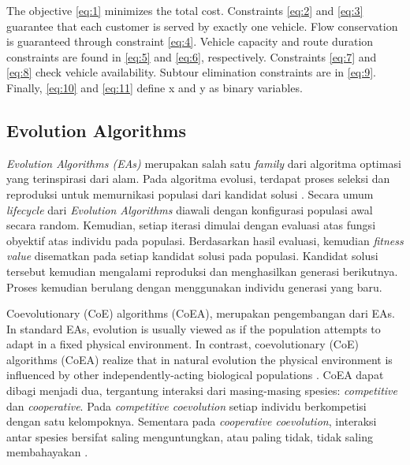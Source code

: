 \documentclass[conference]{IEEEtran}
\begin{document}
The objective \ref{eq:1} minimizes the total cost. Constraints \ref{eq:2} and \ref{eq:3} guarantee that each customer is served by exactly one vehicle. Flow conservation is guaranteed through constraint \ref{eq:4}. Vehicle capacity and route duration constraints are found in \ref{eq:5} and \ref{eq:6}, respectively. Constraints \ref{eq:7} and \ref{eq:8} check vehicle availability. Subtour elimination constraints are in \ref{eq:9}. Finally, \ref{eq:10} and \ref{eq:11} define x and y as binary variables.


\subsection{Evolution Algorithms}
\label{ssec:evolution-algorithms}
\textit{Evolution Algorithms (EAs)} merupakan salah satu \textit{family} dari algoritma optimasi yang terinspirasi dari alam. Pada algoritma evolusi, terdapat proses seleksi dan reproduksi untuk memurnikasi populasi dari kandidat solusi \cite{eugster_many_2003}. Secara umum \textit{lifecycle} dari \textit{Evolution Algorithms} diawali dengan  konfigurasi populasi awal secara random. Kemudian, setiap iterasi dimulai dengan evaluasi atas fungsi obyektif atas individu pada populasi. Berdasarkan hasil evaluasi, kemudian \textit{fitness value} disematkan pada setiap kandidat solusi pada populasi. Kandidat solusi tersebut kemudian mengalami reproduksi dan menghasilkan generasi berikutnya. Proses kemudian berulang dengan menggunakan individu generasi yang baru.


Coevolutionary (CoE) algorithms (CoEA), merupakan pengembangan dari EAs. In standard EAs, evolution is usually viewed as if the population attempts to adapt in a fixed physical environment. In contrast, coevolutionary (CoE) algorithms (CoEA) realize that in natural evolution the physical environment is influenced by other independently-acting biological populations \cite{engelbrecht_coevolution_2007}. CoEA dapat dibagi menjadi dua, tergantung interaksi dari masing-masing spesies: \textit{competitive} dan \textit{cooperative}. Pada \textit{competitive coevolution} setiap individu berkompetisi dengan satu kelompoknya. Sementara pada \textit{cooperative coevolution}, interaksi antar spesies bersifat saling menguntungkan, atau paling tidak, tidak saling membahayakan \cite{engelbrecht_coevolution_2007}.


\end{document}
